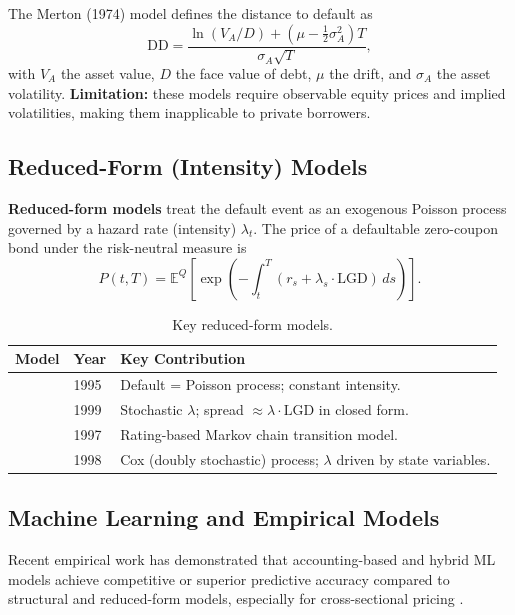 \documentclass[12pt, a4paper]{article}
\theoremstyle{definition}
\begin{document}
The Merton (1974) model defines the distance to default as
\begin{equation}
  \text{DD} = \frac{\ln(V_A/D) + (\mu - \tfrac{1}{2}\sigma_A^2)T}{\sigma_A \sqrt{T}},
\end{equation}
with $V_A$ the asset value, $D$ the face value of debt, $\mu$ the drift, and
$\sigma_A$ the asset volatility.
\textbf{Limitation:} these models require observable equity prices and implied
volatilities, making them inapplicable to private borrowers.

\subsection{Reduced-Form (Intensity) Models}

\textbf{Reduced-form models} treat the default event as an exogenous Poisson process
governed by a hazard rate (intensity) $\lambda_t$.
The price of a defaultable zero-coupon bond under the risk-neutral measure is
\begin{equation}
  P(t, T) = \mathbb{E}^Q\!\left[\exp\!\left(-\int_t^T (r_s + \lambda_s \cdot \text{LGD})\,ds\right)\right].
\end{equation}

\begin{table}[H]
\centering
\caption{Key reduced-form models.}
\label{tab:reducedform}
\begin{tabular}{llp{7.5cm}}
\toprule
\textbf{Model} & \textbf{Year} & \textbf{Key Contribution} \\
\midrule
\citet{jarrowturnbull1995}  & 1995 & Default = Poisson process; constant intensity. \\
\citet{duffie1999modeling}  & 1999 & Stochastic $\lambda$; spread $\approx \lambda \cdot \text{LGD}$ in closed form. \\
\citet{jarrowlando1997}     & 1997 & Rating-based Markov chain transition model. \\
\citet{lando1998cox}        & 1998 & Cox (doubly stochastic) process; $\lambda$ driven by state variables. \\
\bottomrule
\end{tabular}
\end{table}

\subsection{Machine Learning and Empirical Models}

Recent empirical work has demonstrated that accounting-based and hybrid
ML models achieve competitive or superior predictive accuracy compared to
structural and reduced-form models, especially for cross-sectional pricing
\citep{altman1968financial, mai2019deep}.
\end{document}
